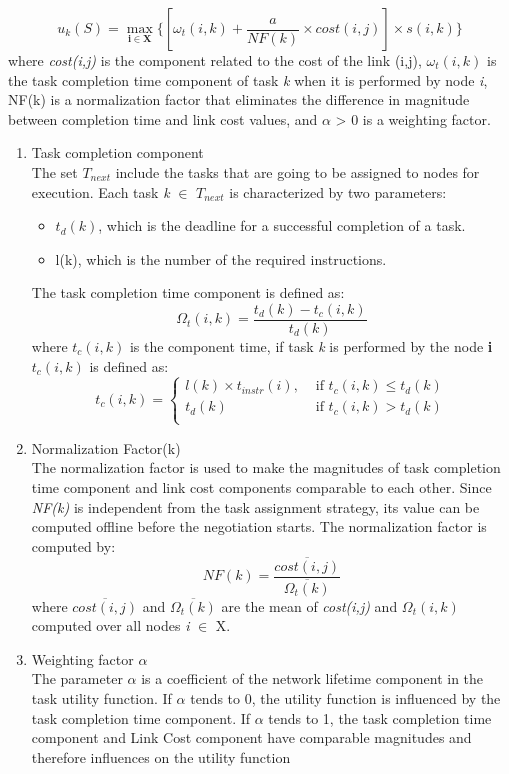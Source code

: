 \documentclass[a4paper]{article}
\begin{document}
\begin{equation}%
u_k (S) = \max_{\mathbf{i} \in \mathbf{X}} \{[\omega_t(i,k) + \frac{a}{NF(k)} \times cost(i,j)] \times s(i,k)\}
\end{equation}
where \textit{cost(i,j)} is the component related to the cost of the link (i,j), $\omega_t(i,k)$ is the task completion time component of task \textit{k} when it is performed by node \textit{i}, NF(k) is a normalization factor that eliminates the difference in magnitude between completion time and link cost values, and $\alpha$ > 0 is a weighting factor. \\

\begin{enumerate}
\item Task completion component \\
The set $T_{next}$ include the tasks that are going to be assigned to nodes for execution. Each task \textit{k} $\in$ $T_{next}$ is characterized by two parameters: 
\begin{itemize}  
\item $t_d(k)$, which is the deadline for a successful completion of a task.
\item l(k), which is the number of the required instructions. 
\end{itemize}
The task completion time component is defined as: 
\begin{equation}
\Omega_t(i,k) = \frac{t_d(k) - t_c(i,k)}{t_d(k)}
\end{equation}
where $t_c(i,k)$ is the component time, if task \textit{k} is performed by the node \textbf{i} $t_c(i,k)$ is defined as: 
$$
t_c(i,k) = \left\{ \begin{array}{lr}
 l(k) \times t_{instr}(i), &\mbox{ if $t_c(i,k) \le t_d(k)$} \\
  t_d(k) &\mbox{ if $t_c(i,k) > t_d(k)$} \\
       \end{array} \right.
$$
\item Normalization Factor(k) \\
The normalization factor is used to make the magnitudes of task completion time component and link cost components comparable to each other. Since \textit{NF(k)} is independent from the task assignment strategy, its value can be computed offline before the negotiation starts. The normalization factor is computed by: 
\begin{equation}
NF(k)= \frac{\overline{cost(i,j)}}{\overline{\Omega_t(k)}}
\end{equation}
where $\overline{cost(i,j)}$ and $\overline{\Omega_t(k)}$ are the mean of \textit{cost(i,j)} and \textit{$\Omega_t(i,k)$} computed over all nodes \textit{i} $\in$ X.
\item Weighting factor $\alpha$\\
The parameter $\alpha$  is a coefficient of the network lifetime component in the task utility function. If $\alpha$ tends to 0, the utility function is influenced by the task completion time component. If $\alpha$ tends to 1, the task completion time component and Link Cost component have comparable magnitudes and therefore influences on the utility function


\end{enumerate}
\end{document}
